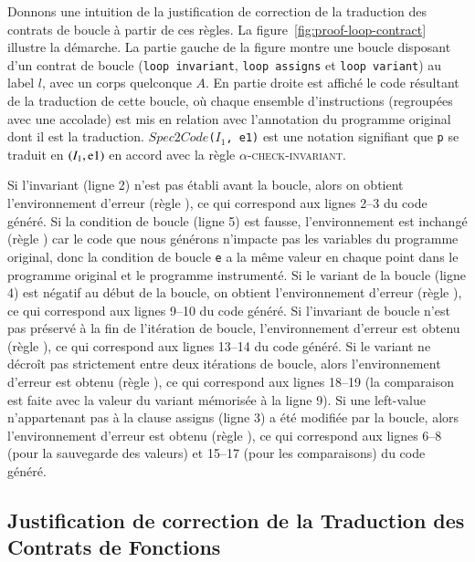 Donnons une intuition de la justification de correction de la traduction des
contrats de boucle à partir de ces règles.
La figure~\ref{fig:proof-loop-contract} illustre la démarche.
La partie gauche de la figure montre une boucle disposant d'un contrat de boucle
(\lstinline'loop invariant', \lstinline'loop assigns' et
\lstinline'loop variant') au label $l$, avec un corps quelconque $A$.
En partie droite est affiché le code résultant de la traduction de cette
boucle, où chaque ensemble d'instructions (regroupées avec une accolade) est
mis en relation avec l'annotation du programme original dont il est la
traduction.
$Spec2Code$\lstinline'('$I_1$\lstinline', e1)' est une notation signifiant que
\lstinline'p' se traduit en $(I_1, \mbox{\lstinline'e1'})$ en accord avec la
règle \textsc{$\alpha$-check-invariant}.

Si l'invariant (ligne 2) n'est pas établi avant la boucle, alors on obtient
l'environnement d'erreur (règle ), ce qui correspond aux
lignes 2--3 du code généré.
Si la condition de boucle (ligne 5) est fausse, l'environnement est inchangé
(règle ) car le code que nous générons n'impacte pas les
variables du programme original, donc la condition de boucle \lstinline'e' a la
même valeur en chaque point dans le programme original et le programme
instrumenté.
Si le variant de la boucle (ligne 4) est négatif au début de la boucle, on
obtient l'environnement d'erreur (règle ), ce qui correspond
aux lignes 9--10 du code généré.
Si l'invariant de boucle n'est pas préservé à la fin de l'itération de boucle,
l'environnement d'erreur est obtenu (règle ), ce qui
correspond aux lignes 13--14 du code généré.
Si le variant ne décroît pas strictement entre deux itérations de boucle, alors
l'environnement d'erreur est obtenu (règle ), ce qui
correspond aux lignes 18--19 (la comparaison est faite avec la valeur du variant
mémorisée à la ligne 9).
Si une left-value n'appartenant pas à la clause assigns (ligne 3) a été modifiée
par la boucle, alors l'environnement d'erreur est obtenu (règle
), ce qui correspond aux lignes 6--8 (pour la sauvegarde des
valeurs) et 15--17 (pour les comparaisons) du code généré.





\subsection{Justification de correction de la Traduction des Contrats de
  Fonctions}

